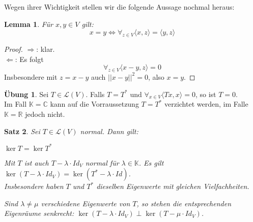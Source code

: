 \documentclass[12pt,a4paper]{article}
\newtheorem{theorem}{Satz}
\newtheorem{lemma}[theorem]{Lemma}
\theoremstyle{definition}
\newtheorem*{exercise}{Übung}
\theoremstyle{remark}
\begin{document}
	Wegen ihrer Wichtigkeit stellen wir die folgende Aussage nochmal heraus:
	
	\begin{lemma}
		Für $x,y \in V$ gilt:
		\begin{equation}
			x = y \Leftrightarrow \forall_{z \in V} \langle x,z \rangle = \langle y,z \rangle
		\end{equation}
	\end{lemma}
	
	\begin{proof}
		$\Rightarrow$: klar. \\
		$\Leftarrow$: Es folgt 
		\begin{equation}
			\forall_{z \in V} \langle x-y,z \rangle = 0
		\end{equation}
		Insbesondere mit $z = x-y$ auch $||x-y ||^2 = 0$, also $x=y$.
	\end{proof}
	
	\begin{exercise}
		Sei $T \in \mathcal{L}(V)$. Falls $T = T^*$ und $\forall_{x \in V} \langle Tx,x \rangle = 0$, so ist $T=0$.  \\
		Im Fall $\mathbb{K} = \mathbb{C}$ kann auf die Vorraussetzung $T = T^*$ verzichtet werden, im Falle $\mathbb{K}= \mathbb{R}$ jedoch nicht.
	\end{exercise}
	
	\begin{theorem}
		Sei $T \in \mathcal{L}(V)$ normal. Dann gilt: \\
		\begin{proofenum}
			\item $\ker T = \ker T^*$
			\item Mit $T$ ist auch $T-\lambda \cdot Id_V$ normal für $\lambda \in \mathbb{K}$. Es gilt $\ker (T-\lambda \cdot Id_V) = \ker (T^* - \lambda \cdot Id)$. \\ Insbesondere haben $T$ und $T^*$ dieselben Eigenwerte mit gleichen Vielfachheiten.
			\item Sind $\lambda \neq \mu$ verschiedene Eigenwerte von $T$, so stehen die entsprechenden Eigenräume senkrecht: $\ker (T-\lambda \cdot Id_V) \perp \ker (T-\mu \cdot Id_V)$.
		\end{proofenum}
	\end{theorem}
	
\end{document}
